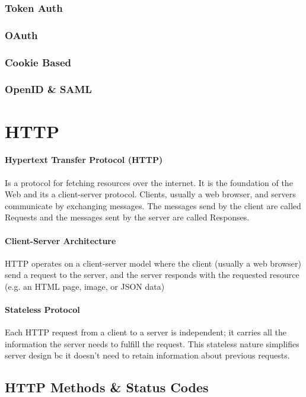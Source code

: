 \documentclass[a4paper]{article}
\begin{document}
    \subsubsection{Token Auth}
    \subsubsection{OAuth}
    \subsubsection{Cookie Based}
    \subsubsection{OpenID \& SAML}

    \section*{HTTP}

    \paragraph{Hypertext Transfer Protocol (HTTP)} Is a protocol for fetching resources over the internet. It is the foundation of the Web and its a client-server protocol. Clients, usually a web browser, and servers communicate by exchanging messages. The messages send by the client are called Requests and the messages sent by the server are called Responses.

    \paragraph*{Client-Server Architecture} HTTP operates on a client-server model where the client (usually a web browser) send a request to the server, and the server responds with the requested resource (e.g. an HTML page, image, or JSON data)

    \paragraph*{Stateless Protocol} Each HTTP request from a client to a server is independent; it carries all the information the server needs to fulfill the request. This stateless nature simplifies server design bc it doesn't need to retain information about previous requests.

    \subsection{HTTP Methods \& Status Codes}
\end{document}
